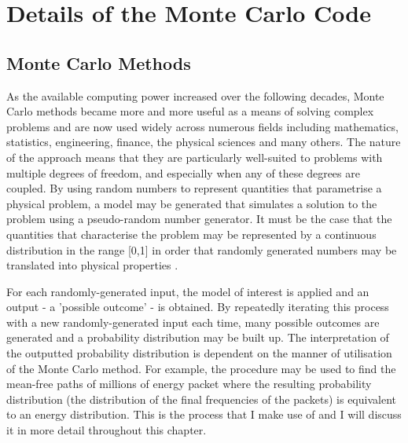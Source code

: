 \chapter{Details of the Monte Carlo Code}\label{chp:chp2}

%
%


\section{Monte Carlo Methods}
	 
	 
	 As the available computing power increased over the following decades, Monte Carlo methods became more and more useful as a means of solving complex problems and are now used widely across numerous fields including mathematics, statistics, engineering, finance, the physical sciences and many others.  The nature of the approach means that they are particularly well-suited to problems with multiple degrees of freedom, and especially when any of these degrees are coupled.  By using random numbers to represent quantities that parametrise a physical problem, a model may be generated that simulates a solution to the problem using a pseudo-random number generator.   It must be the case that the quantities that characterise the problem may be represented by a continuous distribution in the range [0,1] in order that randomly generated numbers may be translated into physical properties \citep{Shreider1966}.  
	 
	 For each randomly-generated input, the model of interest is applied and an output - a 'possible outcome' - is obtained.  By repeatedly iterating this process with a new randomly-generated input each time, many possible outcomes are generated and a probability distribution may be built up.  The interpretation of the outputted probability distribution is dependent on the manner of utilisation of the Monte Carlo method.  For example, the procedure may be used to find the mean-free paths of millions of energy packet where the resulting probability distribution (the distribution of the final frequencies of the packets) is equivalent to an energy distribution.  This is the process that I make use of and I will discuss it in more detail throughout this chapter.
	 
